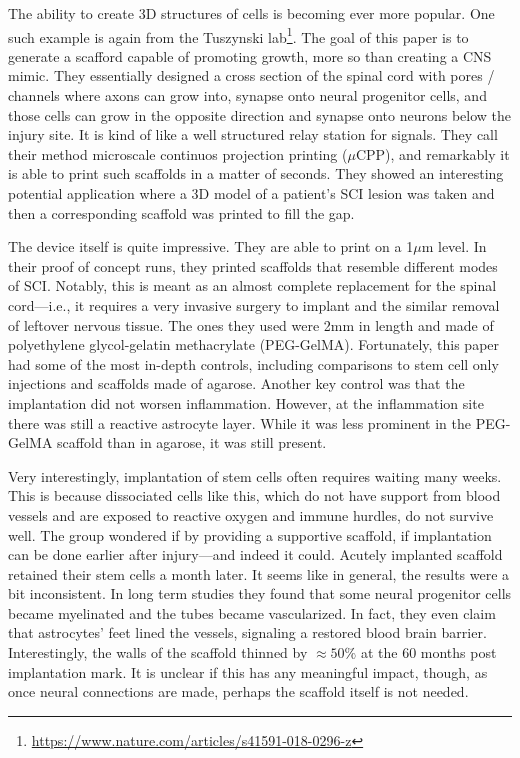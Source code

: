\documentclass[12pt]{report}
\begin{document}
The ability to create 3D structures of cells is becoming ever more popular. One such example is again from the Tuszynski lab\footnote{\url{https://www.nature.com/articles/s41591-018-0296-z}}. The goal of this paper is to generate a scafford capable of promoting growth, more so than creating a CNS mimic. They essentially designed a cross section of the spinal cord with pores / channels where axons can grow into, synapse onto neural progenitor cells, and those cells can grow in the opposite direction and synapse onto neurons below the injury site. It is kind of like a well structured relay station for signals. They call their method microscale continuos projection printing ($\mu$CPP), and remarkably it is able to print such scaffolds in a matter of seconds. They showed an interesting potential application where a 3D model of a patient's SCI lesion was taken and then a corresponding scaffold was printed to fill the gap. \newline

The device itself is quite impressive. They are able to print on a 1$\mu$m level. In their proof of concept runs, they printed scaffolds that resemble different modes of SCI. Notably, this is meant as an almost complete replacement for the spinal cord---i.e., it requires a very invasive surgery to implant and the similar removal of leftover nervous tissue. The ones they used were 2mm in length and made of polyethylene glycol-gelatin methacrylate (PEG-GelMA). Fortunately, this paper had some of the most in-depth controls, including comparisons to stem cell only injections and scaffolds made of agarose. Another key control was that the implantation did not worsen inflammation. However, at the inflammation site there was still a reactive astrocyte layer. While it was less prominent in the PEG-GelMA scaffold than in agarose, it was still present.\newline

Very interestingly, implantation of stem cells often requires waiting many weeks. This is because dissociated cells like this, which do not have support from blood vessels and are exposed to reactive oxygen and immune hurdles, do not survive well. The group wondered if by providing a supportive scaffold, if implantation can be done earlier after injury---and indeed it could. Acutely implanted scaffold retained their stem cells a month later. It seems like in general, the results were a bit inconsistent. In long term studies they found that some neural progenitor cells became myelinated and the tubes became vascularized. In fact, they even claim that astrocytes' feet lined the vessels, signaling a restored blood brain barrier. Interestingly, the walls of the scaffold thinned by $\approx 50\%$ at the 60 months post implantation mark. It is unclear if this has any meaningful impact, though, as once neural connections are made, perhaps the scaffold itself is not needed.\newline
\end{document}
